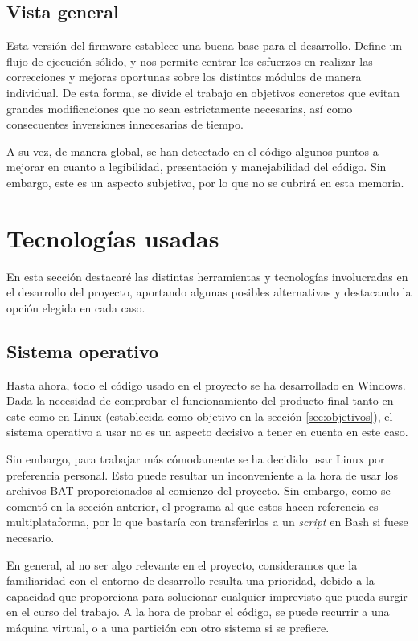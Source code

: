 \subsection{Vista general}

Esta versión del firmware establece una buena base para el desarrollo. Define un flujo de ejecución sólido, y nos permite centrar los esfuerzos en realizar las correcciones y mejoras oportunas sobre los distintos módulos de manera individual. De esta forma, se divide el trabajo en objetivos concretos que evitan grandes modificaciones que no sean estrictamente necesarias, así como consecuentes inversiones innecesarias de tiempo.

A su vez, de manera global, se han detectado en el código algunos puntos a mejorar en cuanto a legibilidad, presentación y manejabilidad del código. Sin embargo, este es un aspecto subjetivo, por lo que no se cubrirá en esta memoria.

\section{Tecnologías usadas}

En esta sección destacaré las distintas herramientas y tecnologías involucradas en el desarrollo del proyecto, aportando algunas posibles alternativas y destacando la opción elegida en cada caso.

\subsection{Sistema operativo}

Hasta ahora, todo el código usado en el proyecto se ha desarrollado en Windows. Dada la necesidad de comprobar el funcionamiento del producto final tanto en este como en Linux (establecida como objetivo en la sección \ref{sec:objetivos}), el sistema operativo a usar no es un aspecto decisivo a tener en cuenta en este caso.

Sin embargo, para trabajar más cómodamente se ha decidido usar Linux por preferencia personal. Esto puede resultar un inconveniente a la hora de usar los archivos BAT proporcionados al comienzo del proyecto. Sin embargo, como se comentó en la sección anterior, el programa al que estos hacen referencia es multiplataforma, por lo que bastaría con transferirlos a un \textit{script} en Bash si fuese necesario.

En general, al no ser algo relevante en el proyecto, consideramos que la familiaridad con el entorno de desarrollo resulta una prioridad, debido a la capacidad que proporciona para solucionar cualquier imprevisto que pueda surgir en el curso del trabajo. A la hora de probar el código, se puede recurrir a una máquina virtual, o a una partición con otro sistema si se prefiere.


